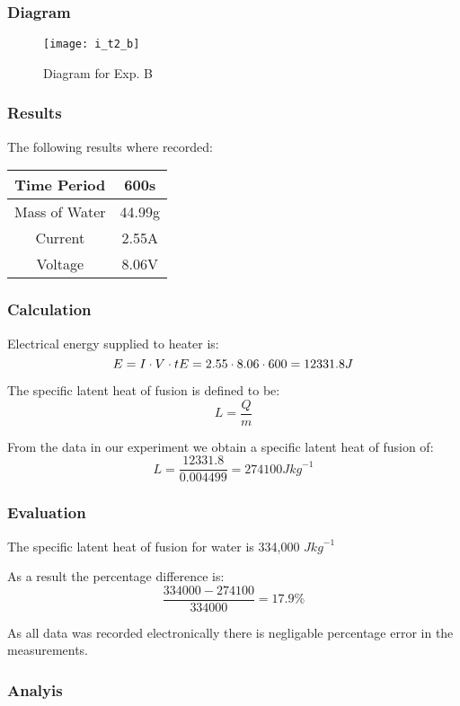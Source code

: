 \subsubsection{Diagram}
\begin{figure}
    \centering
    \texttt{[image: i\_t2\_b]}
    \caption{Diagram for Exp. B}
\end{figure}

\subsubsection{Results}
The following results where recorded:
\begin{center}
    \begin{tabular}{ |c|c| } 
        \hline
        Time Period & 600s \\ \hline
        Mass of Water & 44.99g\\ \hline
        Current & 2.55A \\ \hline
        Voltage & 8.06V \\
        \hline
        \end{tabular}
\end{center}

\subsubsection{Calculation}
Electrical energy supplied to heater is:
\begin{equation*}
    E = I \cdot V \cdot t \\
    E = 2.55 \cdot 8.06 \cdot 600 = 12331.8J\\
\end{equation*}

The specific latent heat of fusion is defined to be:
\begin{equation*}
    L = \frac{Q}{m}
\end{equation*}

From the data in our experiment we obtain a specific latent heat of fusion of:
\begin{equation*}
    L = \frac{12331.8}{0.004499} = 274100 J {kg}^{-1}
\end{equation*}

\subsubsection{Evaluation}
The specific latent heat of fusion for water is 334,000 $J {kg}^{-1}$

As a result the percentage difference is:
\begin{equation*}
    \frac{334000-274100}{334000} = 17.9 \%
\end{equation*}

As all data was recorded electronically there is negligable percentage error in the measurements.

\subsubsection{Analyis}
